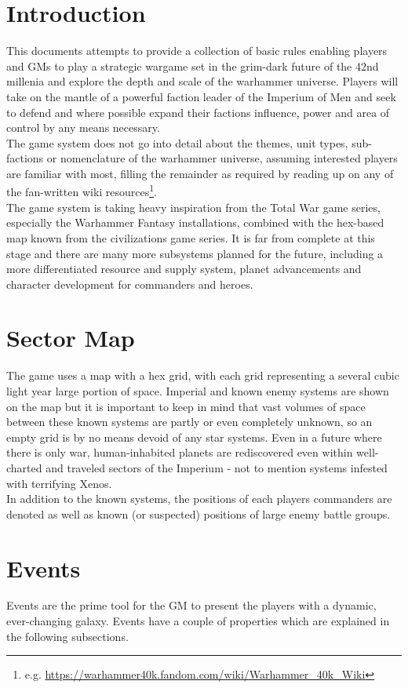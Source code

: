 
\section{Introduction}
This documents attempts to provide a collection of basic rules enabling players and GMs to play a strategic wargame set in the grim-dark future of the 42nd millenia and explore the depth and scale of the warhammer universe. Players will take on the mantle of a powerful faction leader of the Imperium of Men and seek to defend and where possible expand their factions influence, power and area of control by any means necessary.\\
The game system does not go into detail about the themes, unit types, sub-factions or nomenclature of the warhammer universe, assuming interested players are familiar with most, filling the remainder as required by reading up on any of the fan-written wiki resources\footnote{e.g. \url{https://warhammer40k.fandom.com/wiki/Warhammer_40k_Wiki}}.\\
The game system is taking heavy inspiration from the Total War game series, especially the Warhammer Fantasy installations, combined with the hex-based map known from the civilizations game series. It is far from complete at this stage and there are many more subsystems planned for the future, including a more differentiated resource and supply system, planet advancements and character development for commanders and heroes.

\section{Sector Map}
The game uses a map with a hex grid, with each grid representing a several cubic light year large portion of space. 
Imperial and known enemy systems are shown on the map but it is important to keep in mind that vast volumes of space between these known systems are partly or even completely unknown, so an empty grid is by no means devoid of any star systems. Even in a future where there is only war, human-inhabited planets are rediscovered even within well-charted and traveled sectors of the Imperium - not to mention systems infested with terrifying Xenos.\\
In addition to the known systems, the positions of each players commanders are denoted as well as known (or suspected) positions of large enemy battle groups.

\section{Events}
Events are the prime tool for the GM to present the players with a dynamic, ever-changing galaxy. Events have a couple of properties which are explained in the following subsections.

